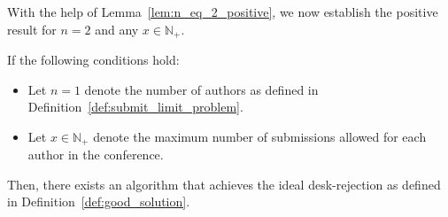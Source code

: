 With the help of Lemma~\ref{lem:n_eq_2_positive}, we now establish the positive result for $n=2$ and any $x \in \mathbb{N}_+$.

\begin{lemma} [Positive result for $n=2$ and any $x\in\mathbb{N}_+$, general case] \label{lem:n_eq_2_positive_general}
If the following conditions hold:
\begin{itemize}
    \item Let $n = 1$ denote the number of authors as defined in Definition~\ref{def:submit_limit_problem}.
    \item Let $x \in \mathbb{N}_+$ denote the maximum number of submissions allowed for each author in the conference. 
\end{itemize}

Then, there exists an algorithm that achieves the ideal desk-rejection as defined in Definition~\ref{def:good_solution}.
\end{lemma}

